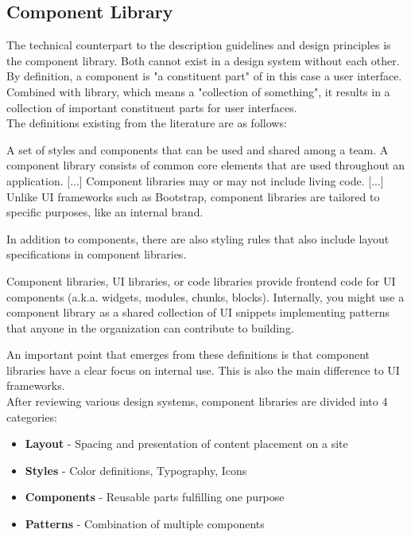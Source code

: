 \subsection{Component Library}
The technical counterpart to the description guidelines and design principles is the component library. Both cannot exist in a design system without each other.  By definition, a component is "a constituent part"  of in this case a user interface. \cite{component_definition} Combined with library, which means a "collection of something", it results in a collection of important constituent parts for user interfaces. \cite{library_definition} \\
The definitions existing from the literature are as follows:
\begin{tcolorbox}[title=Definition of component library by \citet*{vesselov_building_2019}]
A set of styles and components that can be used and shared among a team. A component library consists of common core elements that are used throughout an application. [...] Component libraries may or may not include living code. [...] Unlike UI frameworks such as Bootstrap, component libraries are tailored to specific purposes, like an internal brand.
\end{tcolorbox}
In addition to components, there are also styling rules that also include layout specifications in component libraries. 
\begin{tcolorbox}[title=Definition of component library by \citet*{macdonald_practical_2019}]
Component libraries, UI libraries, or code libraries provide frontend code for UI components (a.k.a. widgets, modules, chunks, blocks). Internally, you might use a component library as a shared collection of UI snippets implementing patterns that anyone in the organization can contribute to building.
\end{tcolorbox}
An important point that emerges from these definitions is that component libraries have a clear focus on internal use. This is also the main difference to UI frameworks. \\
After reviewing various design systems, component libraries are divided into 4 categories:
\begin{itemize}
	\item \textbf{Layout} - Spacing and presentation of content placement on a site
	\item \textbf{Styles} - Color definitions, Typography, Icons
	\item \textbf{Components} - Reusable parts fulfilling one purpose
	\item \textbf{Patterns} - Combination of multiple components 
\end{itemize}

